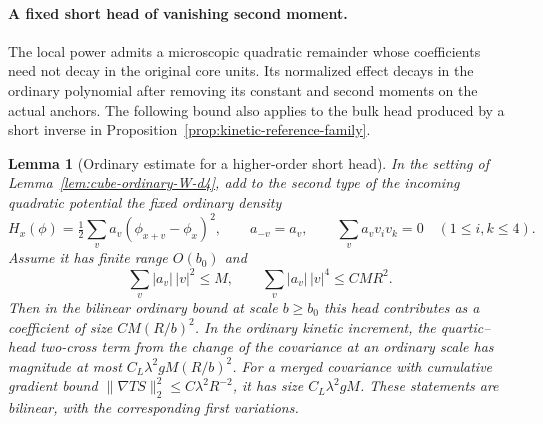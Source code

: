 \documentclass[11pt]{article}
\newtheorem{lemma}[theorem]{Lemma}
\theoremstyle{definition}
\begin{document}
\paragraph{A fixed short head of vanishing second moment.}
The local power admits a microscopic quadratic remainder
whose coefficients need not decay in the original core
units. Its normalized effect decays in the ordinary
polynomial after removing its constant and second moments
on the actual anchors. The following bound also applies to
the bulk head produced by a short inverse in
Proposition~\ref{prop:kinetic-reference-family}.

\begin{lemma}[Ordinary estimate for a higher-order short head]
\label{lem:cube-fixed-short-head}
In the setting of Lemma~\ref{lem:cube-ordinary-W-d4}, add to
the second type of the incoming quadratic potential the
fixed ordinary density
\begin{equation}
 H_x(\phi)=\tfrac12\sum_v a_v(\phi_{x+v}-\phi_x)^2,\qquad
 a_{-v}=a_v,\qquad \sum_v a_v v_i v_k=0\quad(1\le i,k\le4).
\end{equation}
Assume it has finite range \(O(b_0)\) and
\begin{equation}
 \sum_v |a_v|\,|v|^2\le M,\qquad
 \sum_v |a_v|\,|v|^4\le C M R^2 .
\end{equation}
Then in the bilinear ordinary bound at scale \(b\ge b_0\)
this head contributes as a coefficient of size
\(C M(R/b)^2\). In the ordinary kinetic increment, the
quartic--head two-cross term from the change of the
covariance at an ordinary scale has magnitude at most
\(C_L\lambda^2 g M(R/b)^2\).
For a merged covariance with cumulative gradient bound
\(\|\nabla TS\|_2^2\le C\lambda^2 R^{-2}\), it has size
\(C_L\lambda^2 g M\).
These statements are bilinear, with the corresponding
first variations.
\end{lemma}
\end{document}
